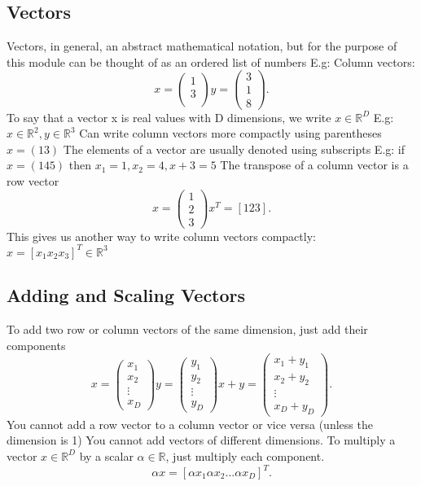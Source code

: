 \documentclass[a4paper]{article}
\newcommand{\R}{\mathbb{R}}
\begin{document}
	\subsection{Vectors}
	Vectors, in general, an abstract mathematical notation, but for the purpose of this module can be
	thought of as an ordered list of numbers
	E.g: Column vectors:
	\[
		x = \begin{pmatrix} 1\\ 3\\ \end{pmatrix} 
		y = \begin{pmatrix} 3\\ 1\\ 8 \end{pmatrix}
	.\]
	To say that a vector x is real values with D dimensions, we write $x \in \R^D$ 
	E.g: $x \in \R^2, y \in \R^3 $ 
	Can write column vectors more compactly using parentheses $x = (13)$ 
	The elements of a vector are usually denoted using subscripts
	E.g: if $x = (1 4 5)$ then $x_1 = 1, x_2 = 4, x+3 = 5$
	The transpose of a column vector is a row vector
	\[
		x = \begin{pmatrix} 1\\ 2\\ 3 \end{pmatrix}
		x^T = [1 2 3]
	.\]
	This gives us another way to write column vectors compactly:
	$x = [x_1 x_2 x_3]^T \in \R^3$
	\subsection{Adding and Scaling Vectors}
	To add two row or column vectors of the same dimension, just add their components
	\[
		x = \begin{pmatrix} x_1\\ x_2 \\ \vdots\\ x_D \end{pmatrix} 
		y = \begin{pmatrix} y_1\\ y_2 \\ \vdots\\ y_D \end{pmatrix}
		x+y = \begin{pmatrix} x_1+y_1 \\ x_2 +y_2 \\ \vdots\\ x_D+y_D \end{pmatrix}
	.\]
	You cannot add a row vector to a column vector or vice versa (unless the dimension is 1)
	You cannot add vectors of different dimensions.
	To multiply a vector $x \in \R^D$ by a scalar $\alpha \in \R$, just multiply each component.
	\[
		\alpha x = [\alpha x_1 \alpha x_2 \ldots \alpha x_D]^T
	.\]
\end{document}
